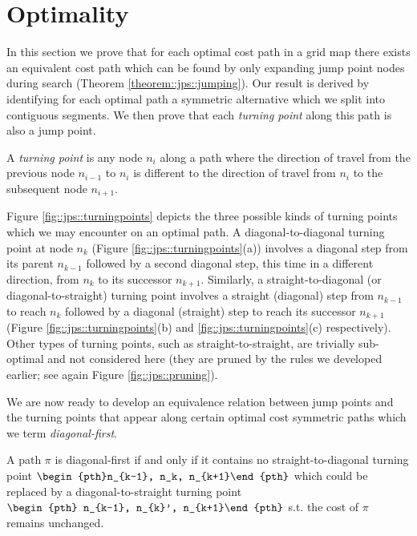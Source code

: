 \section{Optimality}
In this section we prove that for each optimal cost path in a grid map there
exists an equivalent cost path which can be found by only expanding jump
point nodes during search (Theorem \ref{theorem::jps::jumping}).  Our result is
derived by identifying for each optimal path a symmetric alternative which we
split into contiguous segments. We then prove that each \emph{turning point}
along this path is also a jump point.

\begin{definition}
\label{def::jps::turningpoint}
A \emph{turning point} is any node $n_{i}$ along a path where the direction of
travel from the previous node $n_{i-1}$ to $n_{i}$ is different to the direction
of travel from $n_{i}$ to the subsequent node $n_{i+1}$.
\end{definition}

Figure \ref{fig::jps::turningpoints} depicts the three possible kinds of turning
points which we may encounter on an optimal path. A diagonal-to-diagonal turning
point at node $n_k$ (Figure \ref{fig::jps::turningpoints}(a)) involves a diagonal step
from its parent $n_{k-1}$ followed by a second diagonal step, this time in a
different direction, from $n_{k}$ to its successor $n_{k+1}$.  Similarly, a
straight-to-diagonal (or diagonal-to-straight) turning point involves a straight
(diagonal) step from $n_{k-1}$ to reach $n_{k}$ followed by a diagonal
(straight) step to reach its successor $n_{k+1}$ (Figure
\ref{fig::jps::turningpoints}(b) and \ref{fig::jps::turningpoints}(c) respectively).  
Other types of turning points, such as straight-to-straight, are trivially
sub-optimal and not considered here (they are pruned by the rules we developed
earlier; see again Figure \ref{fig::jps::pruning}).

We are now ready to develop an equivalence relation between
jump points and the turning points that appear along certain optimal cost 
symmetric paths which we term \emph{diagonal-first}.
 
\begin{definition}
A path $\pi$ is diagonal-first if and only if it contains no
straight-to-diagonal turning point $\begin{pth}n_{k-1}, n_k, n_{k+1}\end{pth}$
which could be replaced by a diagonal-to-straight turning point $\begin{pth}
n_{k-1}, n_{k}', n_{k+1}\end{pth}$ s.t.  the cost of $\pi$ remains
unchanged.
\end{definition}

